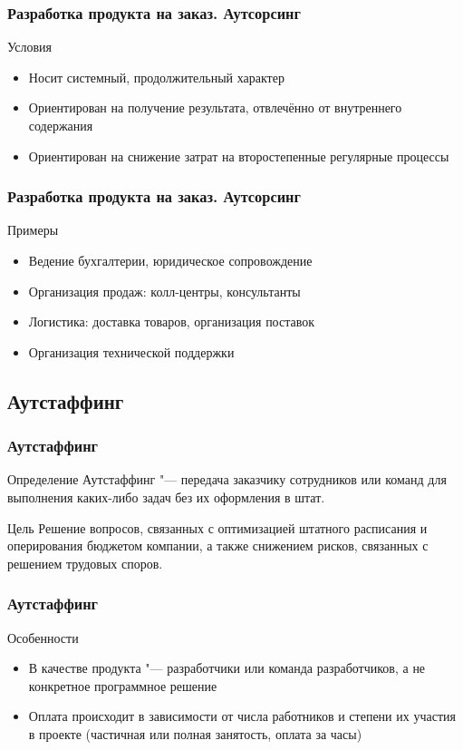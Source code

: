 \documentclass{../industrial-development}
\begin{document}
\begin{frame} \frametitle{Разработка продукта на заказ. Аутсорсинг}
	\begin{block}{Условия}
		\begin{itemize}
			\item Носит системный, продолжительный характер
			\item Ориентирован на получение результата, отвлечённо от внутреннего содержания
			\item Ориентирован на снижение затрат на второстепенные регулярные процессы
		\end{itemize}
	\end{block}
\end{frame}
\lecturenotes


\begin{frame} \frametitle{Разработка продукта на заказ. Аутсорсинг}
	\begin{block}{Примеры}
		\begin{itemize}
			\item Ведение бухгалтерии, юридическое сопровождение
			\item Организация продаж: колл-центры, консультанты
			\item Логистика: доставка товаров, организация поставок
			\item Организация технической поддержки
		\end{itemize}
	\end{block}
\end{frame}
\lecturenotes


\subsection{Аутстаффинг}


\begin{frame} \frametitle{Аутстаффинг}
	\begin{block}{Определение}
		\alert{Аутстаффинг} "--- передача заказчику сотрудников или команд для выполнения каких-либо задач без их оформления в штат. 
	\end{block}
	\begin{block}{Цель}
		Решение вопросов, связанных с оптимизацией штатного расписания и оперирования бюджетом компании, а также снижением рисков, связанных с решением трудовых споров.
	\end{block}
\end{frame}
\lecturenotes


\begin{frame} \frametitle{Аутстаффинг}
	\begin{block}{Особенности}
		\begin{itemize}
			\item В качестве продукта "--- разработчики или команда разработчиков, а не конкретное программное решение
			\item Оплата происходит в зависимости от числа работников и степени их участия в проекте (частичная или полная занятость, оплата за часы)
		\end{itemize}
	\end{block}
\end{frame}
\lecturenotes
\end{document}
